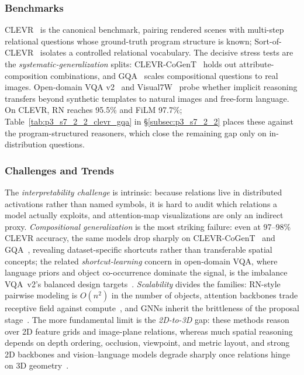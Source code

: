\subsubsection{Benchmarks}

CLEVR~\cite{johnson2017clevr} is the canonical benchmark, pairing rendered scenes with multi-step relational questions whose ground-truth program structure is known; Sort-of-CLEVR~\cite{santoro2017simple} isolates a controlled relational vocabulary.
The decisive stress tests are the \emph{systematic-generalization} splits: CLEVR-CoGenT~\cite{johnson2017clevr} holds out attribute-composition combinations, and GQA~\cite{hudson2019gqa} scales compositional questions to real images.
Open-domain VQA v2~\cite{goyal2017making} and Visual7W~\cite{zhu2016visual7w} probe whether implicit reasoning transfers beyond synthetic templates to natural images and free-form language.
On CLEVR, RN reaches 95.5\% and FiLM 97.7\%; Table~\ref{tab:p3_s7_2_2_clevr_gqa} in §\ref{subsec:p3_s7_2_2} places these against the program-structured reasoners, which close the remaining gap only on in-distribution questions.


\subsubsection{Challenges and Trends}
The \emph{interpretability challenge} is intrinsic: because relations live in distributed activations rather than named symbols, it is hard to audit which relations a model actually exploits, and attention-map visualizations are only an indirect proxy.
\emph{Compositional generalization} is the most striking failure: even at 97--98\% CLEVR accuracy, the same models drop sharply on CLEVR-CoGenT~\cite{johnson2017clevr} and GQA~\cite{hudson2019gqa}, revealing dataset-specific shortcuts rather than transferable spatial concepts; the related \emph{shortcut-learning} concern in open-domain VQA, where language priors and object co-occurrence dominate the signal, is the imbalance VQA~v2's balanced design targets~\cite{goyal2017making}.
\emph{Scalability} divides the families: RN-style pairwise modeling is $O(n^2)$ in the number of objects, attention backbones trade receptive field against compute~\cite{liu2021swin,wang2021pyramid}, and GNNs inherit the brittleness of the proposal stage~\cite{xu2017scene}.
The more fundamental limit is the \emph{2D-to-3D} gap: these methods reason over 2D feature grids and image-plane relations, whereas much spatial reasoning depends on depth ordering, occlusion, viewpoint, and metric layout, and strong 2D backbones and vision--language models degrade sharply once relations hinge on 3D geometry~\cite{daxberger2025mmspatial,xu2025spatialbench}.

